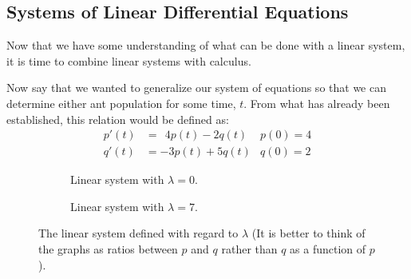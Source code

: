 \subsection{Systems of Linear Differential Equations} \label{sec:ode-sys}

Now that we have some understanding of what can be done with a linear system, it is time to combine linear systems with calculus.

Now say that we wanted to generalize our system of equations so that we can determine either ant population for some time, $t$.
From what has already been established, this relation would be defined as:
\begin{align*}
	p'(t) &=\ \ 4p(t) - 2q(t) &p(0) = 4\\
	q'(t) &= -3p(t) + 5q(t) &q(0) = 2
\end{align*}
\begin{figure}[h!]
	\centering
	\captionsetup[subfigure]{justification=centering}
	\begin{subfigure}[b]{0.4\textwidth}
		\centering
		\caption{\small Linear system with $\lambda = 0$.}
		\label{fig:sample-eigens0}
	\end{subfigure}
	\quad
	\begin{subfigure}[b]{0.4\textwidth}
		\centering
		\caption{\small Linear system with $\lambda = 7$.}
		\label{fig:sample-eigens1}
	\end{subfigure}
	\caption{The linear system defined with regard to $\lambda$ (It is better to think of the graphs as ratios between $p$ and $q$ rather than $q$ as a function of $p$).}
	\label{fig:sample-eigens}
\end{figure}
